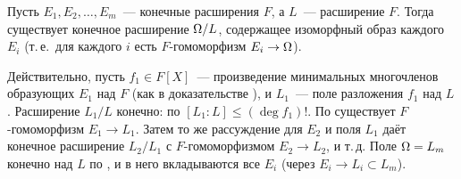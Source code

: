\begin{remark}[2.15]
Пусть $E_1,E_2,\dots,E_m$~--- конечные расширения $F$, а $L$~--- расширение $F$. Тогда существует конечное расширение
$\Omega/L$, содержащее изоморфный образ каждого $E_i$ (т.\,е.\ для каждого $i$ есть $F$-гомоморфизм $E_i\to\Omega$).

Действительно, пусть $f_1\in F[X]$~--- произведение минимальных многочленов образующих $E_1$ над $F$ (как в
доказательстве ), и $L_1$~--- поле разложения $f_1$ над $L$. Расширение $L_1/L$ конечно: по 
$[L_1:L]\le(\deg f_1)!$. По  существует $F$-гомоморфизм $E_1\to L_1$. Затем то же рассуждение для $E_2$ и поля
$L_1$ даёт конечное расширение $L_2/L_1$ с $F$-гомоморфизмом $E_2\to L_2$, и т.\,д. Поле $\Omega=L_m$ конечно над $L$ по
, и в него вкладываются все $E_i$ (через $E_i\to L_i\subset L_m$).
\end{remark}

\par\noindent\begin{minipage}{\linewidth}
\begin{center}
\end{center}
\end{minipage}\par\medskip

